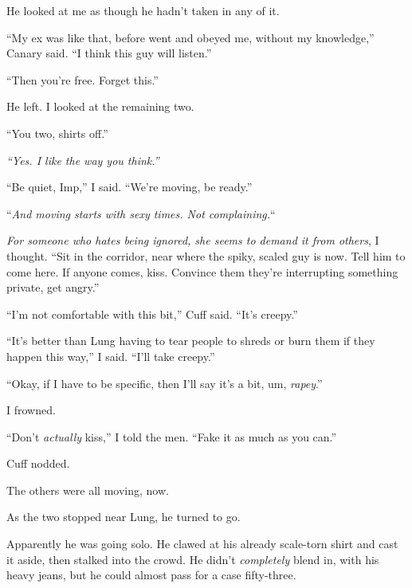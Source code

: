 He looked at me as though he hadn't taken in any of it.



``My ex was like that, before went and obeyed me, without my knowledge,'' Canary said.  ``I think this guy will listen.''



``Then you're free.  Forget this.''



He left.  I looked at the remaining two.



``You two, shirts off.''



\emph{``Yes.  I like the way you think.''}



``Be quiet, Imp,'' I said.  ``We're moving, be ready.''



``\emph{And moving starts with sexy times.  Not complaining.}``



\emph{For someone who hates being ignored, she seems to demand it from others}, I thought.  ``Sit in the corridor, near where the spiky, scaled guy is now.  Tell him to come here.  If anyone comes, kiss.  Convince them they're interrupting something private, get angry.''



``I'm not comfortable with this bit,'' Cuff said.  ``It's creepy.''



``It's better than Lung having to tear people to shreds or burn them if they happen this way,'' I said.  ``I'll take creepy.''



``Okay, if I have to be specific, then I'll say it's a bit, um, \emph{rapey}.''



I frowned.



``Don't \emph{actually} kiss,'' I told the men.  ``Fake it as much as you can.''



Cuff nodded.



The others were all moving, now.



As the two stopped near Lung, he turned to go.



Apparently he was going solo.  He clawed at his already scale-torn shirt and cast it aside, then stalked into the crowd.  He didn't \emph{completely} blend in, with his heavy jeans, but he could almost pass for a case fifty-three.



